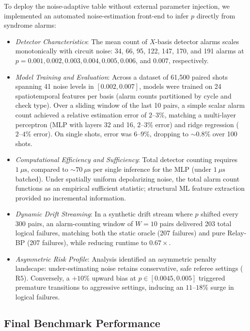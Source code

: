 To deploy the noise-adaptive table without external parameter injection, we implemented an automated noise-estimation front-end to infer $p$ directly from syndrome alarms:
\begin{itemize}
    \item \textit{Detector Characteristics}: The mean count of $X$-basis detector alarms scales monotonically with circuit noise: 34, 66, 95, 122, 147, 170, and 191 alarms at $p = 0.001, 0.002, 0.003, 0.004, 0.005, 0.006$, and $0.007$, respectively.
    \item \textit{Model Training and Evaluation}: Across a dataset of 61,500 paired shots spanning 41 noise levels in $[0.002, 0.007]$, models were trained on 24 spatiotemporal features per basis (alarm counts partitioned by cycle and check type). Over a sliding window of the last 10 pairs, a simple scalar alarm count achieved a relative estimation error of $2\text{--}3\%$, matching a multi-layer perceptron (MLP with layers 32 and 16, $2\text{--}3\%$ error) and ridge regression ($2\text{--}4\%$ error). On single shots, error was $6\text{--}9\%$, dropping to $\sim 0.8\%$ over 100 shots.
    \item \textit{Computational Efficiency and Sufficiency}: Total detector counting requires $1\ \mu\text{s}$, compared to $\sim 70\ \mu\text{s}$ per single inference for the MLP (under $1\ \mu\text{s}$ batched). Under spatially uniform depolarizing noise, the total alarm count functions as an empirical sufficient statistic; structural ML feature extraction provided no incremental information.
    \item \textit{Dynamic Drift Streaming}: In a synthetic drift stream where $p$ shifted every 300 pairs, an alarm-counting window of $W = 10$ pairs delivered 203 total logical failures, matching both the static oracle (207 failures) and pure Relay-BP (207 failures), while reducing runtime to $0.67\times$.
    \item \textit{Asymmetric Risk Profile}: Analysis identified an asymmetric penalty landscape: under-estimating noise retains conservative, safe referee settings ($\text{R5}$). Conversely, a $+10\%$ upward bias at $p \in [0.0045, 0.005]$ triggered premature transitions to aggressive settings, inducing an $11\text{--}18\%$ surge in logical failures.
\end{itemize}

\subsection{Final Benchmark Performance}

